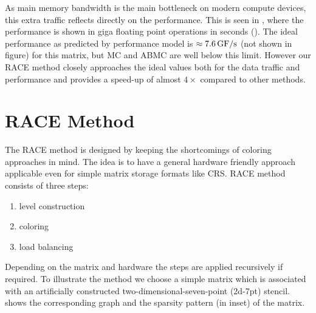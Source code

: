As main memory bandwidth is the main bottleneck on modern compute devices,
 this extra traffic reflects directly on the performance.
This is seen in , where the performance is
shown in giga floating point operations in seconds (\GF). The ideal 
 performance as predicted by performance model is $\approx 7.6\,\mbox{GF/s}$ (not shown in figure)
 for this matrix, but \acrshort{MC} and \acrshort{ABMC} are well below this limit.
 However our \acrshort{RACE} method closely approaches the ideal values both for
 the data traffic and performance and provides a speed-up 
of almost  $4\times$ compared to other methods.

\section{RACE Method} \label{sec:RACE_method}
The \acrshort{RACE} method is designed by  keeping the shortcomings
of coloring approaches in mind. The idea is to have a general hardware 
friendly approach applicable even for simple matrix storage formats 
like \acrshort{CRS}.
\Acrshort{RACE} method consists of three steps:
\begin{enumerate}
	\item level construction
	\item \DK coloring
	\item load balancing
\end{enumerate}
Depending on the matrix and hardware the steps are applied recursively 
if required. 
To illustrate the method we choose a
simple matrix which is associated with an artificially constructed
two-dimensional-seven-point (2d-7pt) stencil.  shows
the corresponding graph and the sparsity pattern (in inset) of the matrix.

